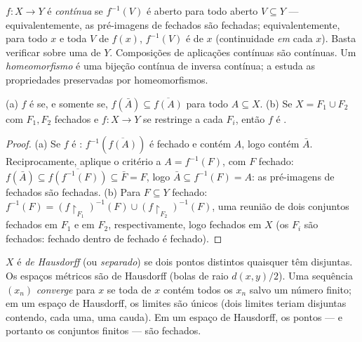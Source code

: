 \begin{definition}\label{def:b3:topology:continuity}
$f \colon X \to Y$ é \emph{contínua} se $f^{-1}(V)$ é aberto para
todo aberto $V \subseteq Y$ --- equivalentemente, as pré-imagens de fechados são
fechadas; equivalentemente, para todo $x$ e toda  $V$
de $f(x)$, $f^{-1}(V)$ é  de $x$ (continuidade \emph{em} cada
$x$). Basta verificar sobre uma  de $Y$. Composições de
aplicações contínuas são contínuas. Um
\emph{homeomorfismo} é uma bijeção contínua de
inversa contínua; a  estuda as propriedades preservadas por
homeomorfismos.
\end{definition}

\begin{proposition}
\label{prop:b3:topology:gluing}
(a) $f$ é  se, e somente se, $f(\bar A) \subseteq \overline{f(A)}$ para todo $A \subseteq X$.
(b) Se $X = F_1 \cup F_2$ com $F_1, F_2$ fechados e $f\colon X
\to Y$ se restringe  a cada
$F_i$, então $f$ é .
\end{proposition}

\begin{proof}
(a) Se $f$ é : $f^{-1}(\overline{f(A)})$ é fechado e contém $A$, logo contém
$\bar A$. Reciprocamente, aplique o critério a $A = f^{-1}(F)$, com $F$
fechado: $f(\bar A) \subseteq
\overline{f(f^{-1}(F))} \subseteq \bar F = F$, logo $\bar A
\subseteq f^{-1}(F) = A$: as pré-imagens de fechados são fechadas.
(b) Para $F \subseteq Y$ fechado: $f^{-1}(F) =
(f\restriction_{F_1})^{-1}(F) \cup (f\restriction_{F_2})^{-1}
(F)$, uma reunião de dois conjuntos fechados em
$F_1$ e em $F_2$, respectivamente, logo fechados em $X$ (os
$F_i$ são fechados: fechado dentro de fechado é fechado).
\end{proof}

\begin{definition}\label{def:b3:topology:hausdorff}
$X$ é \emph{de Hausdorff} (ou
\emph{separado}) se dois pontos distintos quaisquer têm 
disjuntas. Os espaços métricos são de Hausdorff (bolas de raio $d(x,y)/2$).
Uma sequência $(x_n)$ \emph{converge} para $x$ se toda 
de $x$ contém todos os $x_n$ salvo um número finito; em um espaço
de Hausdorff, os limites são únicos (dois limites teriam 
disjuntas contendo, cada uma, uma cauda). Em um espaço de Hausdorff, os
pontos --- e portanto os conjuntos finitos --- são fechados.
\end{definition}

